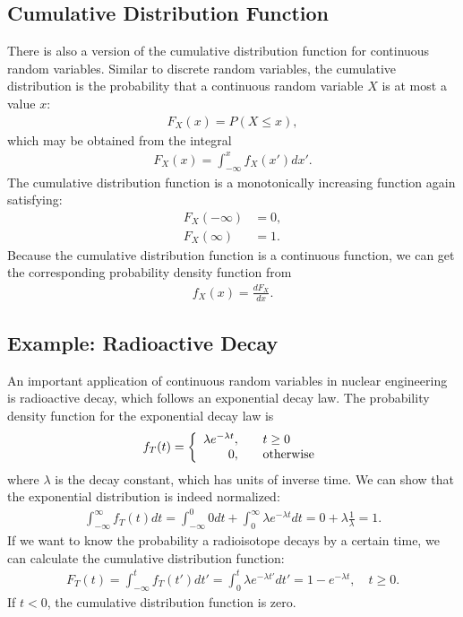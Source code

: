 \subsection{Cumulative Distribution Function}

There is also a version of the cumulative distribution function for continuous random variables. Similar to discrete random variables, the cumulative distribution is the probability that a continuous random variable $X$ is at most a value $x$:
\begin{align}
  F_X(x) = P( X \le x ),
\end{align}
which may be obtained from the integral
\begin{align}
  F_X(x) = \int_{-\infty}^x f_X(x') dx' .
\end{align}
The cumulative distribution function is a monotonically increasing function again satisfying:
\begin{align}
  F_X(-\infty) &= 0, \nonumber \\
  F_X(\infty)  &= 1. \nonumber
\end{align}
Because the cumulative distribution function is a continuous function, we can get the corresponding probability density function from
\begin{align}
  f_X(x) = \frac{dF_X}{dx} .
\end{align}


\subsection{Example: Radioactive Decay}

An important application of continuous random variables in nuclear engineering is radioactive decay, which follows an exponential decay law. The probability density function for the exponential decay law is 
\begin{align}
  f_T(t) = \left\{ \begin{array}{r l} 
    \lambda e^{-\lambda t}, & \quad t \ge 0 \\
    0, & \quad \text{otherwise} \\ \end{array} \right. 
\end{align}
where $\lambda$ is the decay constant, which has units of inverse time. We can show that the exponential distribution is indeed normalized:
\begin{align}
  \int_{-\infty}^\infty f_T(t) dt = \int_{-\infty}^0 0 dt + \int_0^{\infty} \lambda e^{-\lambda t} dt = 0 + \lambda \frac{1}{\lambda} = 1 .
\end{align}
If we want to know the probability a radioisotope decays by a certain time, we can calculate the cumulative distribution function:
\begin{align}
  F_T(t) = \int_{-\infty}^t f_T(t') dt' = \int_0^t  \lambda e^{-\lambda t'} dt' = 1 - e^{-\lambda t}, \quad t \ge 0 .
\end{align}
If $t < 0$, the cumulative distribution function is zero.


